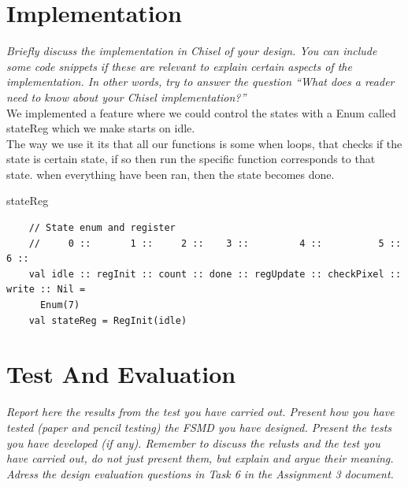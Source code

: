 \documentclass[a4paper, english]{article}
\numberwithin{equation}{section}
\begin{document}
\section{Implementation}
\textit{Briefly discuss the implementation in Chisel of your design. You can include some code snippets if these are relevant to explain certain aspects of the implementation. In other words, try to answer the question ``What does a reader need to know about your Chisel implementation?''}
\\
We implemented a feature where we could control the states with a Enum called stateReg which we make starts on idle. \\
The way we use it its that all our functions is some when loops, that checks if the state is certain state, if so then run the specific function corresponds to that state. when everything have been ran, then the state becomes done.
\begin{listing}[H]
    \centering
    \caption{stateReg}\label{lst:statereg}
    \begin{verbatim}
    // State enum and register
    //     0 ::       1 ::     2 ::    3 ::         4 ::          5 ::     6 ::
    val idle :: regInit :: count :: done :: regUpdate :: checkPixel :: write :: Nil =
      Enum(7)
    val stateReg = RegInit(idle)
\end{verbatim}
\end{listing}
\section{Test And Evaluation}
\textit{Report here the results from the test you have carried out. Present how you have tested (paper and pencil testing) the FSMD you have designed. Present the tests you have developed (if any). Remember to discuss the relusts and the test you have carried out, do not just present them, but explain and argue their meaning. Adress the design evaluation questions in Task 6 in the Assignment 3 document.}



%
%




%
\end{document}
